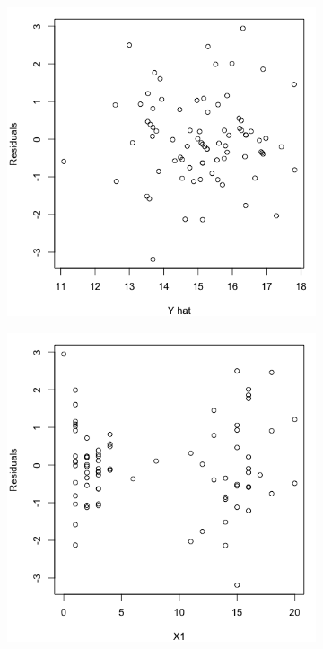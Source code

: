 \documentclass[10pt]{report}
\begin{document}
\begin{enumerate}
	\begin{figure}[H]
		\centering
		\begin{subfigure}[b]{.25\linewidth}
			\includegraphics[width=\linewidth]{p2/18e_yhat.png}
		\end{subfigure}%
		\begin{subfigure}[b]{.25\linewidth}
			\includegraphics[width=\linewidth]{p2/18e_x1.png} 

\end{subfigure}
\end{figure}
\end{enumerate}
\end{document}
